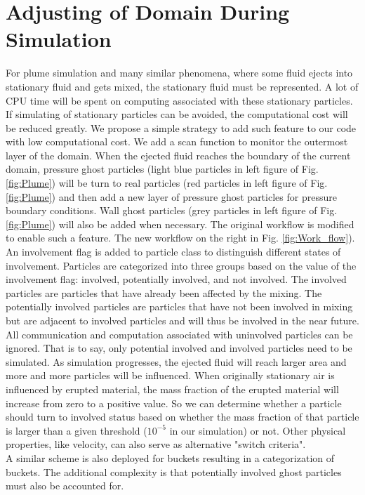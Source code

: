 \documentclass[procedia]{easychair}
\begin{document}
\section{Adjusting of Domain During Simulation} 
For plume simulation and many similar phenomena, where some fluid ejects into stationary fluid and gets mixed, the stationary fluid must be represented.
A lot of CPU time will be spent on computing associated with these stationary particles. If simulating of stationary particles can be avoided, the computational cost will be reduced greatly.
We propose a simple strategy to add such feature to our code with low computational cost. We add a scan function to monitor the outermost layer of the domain. When the ejected fluid reaches the boundary of the current domain, pressure ghost particles (light blue particles in left figure of Fig. \ref{fig:Plume}) will be turn to real particles (red particles in left figure of Fig. \ref{fig:Plume}) and then add a new layer of pressure ghost particles for pressure boundary conditions. Wall ghost particles (grey particles in left figure of Fig. \ref{fig:Plume}) will also be added when necessary. The original workflow is modified to enable such a feature. The new workflow on the right in Fig. \ref{fig:Work_flow}).\\
An involvement flag is added to particle class to distinguish different states of involvement. Particles are categorized into three groups based on the value of the involvement flag: involved, potentially involved, and not involved. The involved particles are particles that have already been affected by the mixing. The potentially involved particles are particles that have not been involved in mixing but are adjacent to involved particles and will thus be involved in the near future. 
All communication and computation associated with uninvolved particles can be ignored. That is to say, only potential involved and involved particles need to be simulated.
As simulation progresses, the ejected fluid will reach larger area and more and more particles will be influenced. When originally stationary air is influenced by erupted material, the mass fraction of the erupted material will increase from zero to a positive value. So we can determine whether a particle should turn to involved status based on whether the mass fraction of that particle is larger than a given threshold ($10^{-5} $ in our simulation) or not. Other physical properties, like velocity, can also serve as alternative "switch criteria".\\
A similar scheme is also deployed for buckets resulting in a categorization of buckets. The additional complexity is that potentially involved ghost particles must also be accounted for.
\end{document}
